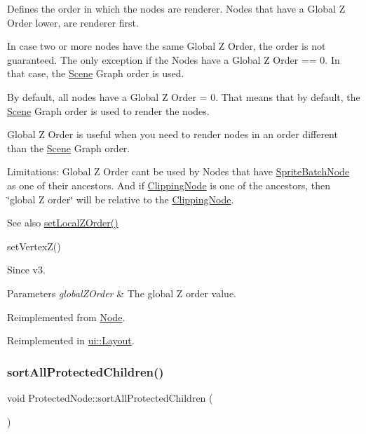 Defines the order in which the nodes are renderer. Nodes that have a Global Z Order lower, are renderer first.

In case two or more nodes have the same Global Z Order, the order is not guaranteed. The only exception if the Nodes have a Global Z Order == 0. In that case, the \hyperlink{classScene}{Scene} Graph order is used.

By default, all nodes have a Global Z Order = 0. That means that by default, the \hyperlink{classScene}{Scene} Graph order is used to render the nodes.

Global Z Order is useful when you need to render nodes in an order different than the \hyperlink{classScene}{Scene} Graph order.

Limitations\+: Global Z Order can\textquotesingle{}t be used by Nodes that have \hyperlink{classSpriteBatchNode}{Sprite\+Batch\+Node} as one of their ancestors. And if \hyperlink{classClippingNode}{Clipping\+Node} is one of the ancestors, then \char`\"{}global Z order\char`\"{} will be relative to the \hyperlink{classClippingNode}{Clipping\+Node}.

\begin{DoxySeeAlso}{See also}
{\ttfamily \hyperlink{classNode_aee4e616c2d55b722226aae1e68b4946f}{set\+Local\+Z\+Order()}} 

{\ttfamily set\+Vertex\+Z()}
\end{DoxySeeAlso}
\begin{DoxySince}{Since}
v3.
\end{DoxySince}

\begin{DoxyParams}{Parameters}
{\em global\+Z\+Order} & The global Z order value. \\
\hline
\end{DoxyParams}


Reimplemented from \hyperlink{classNode_a32a5b9cb9a408d04008c4935a4776566}{Node}.



Reimplemented in \hyperlink{classui_1_1Layout_a5ac5023a3f35c0ba03769ef6794c8537}{ui\+::\+Layout}.

\mbox{\label{classProtectedNode_a9be3508a853fd1c6e841b4ba50f4e1c8}} 
\subsubsection{\texorpdfstring{sort\+All\+Protected\+Children()}{sortAllProtectedChildren()}\hspace{0.1cm}{\footnotesize\ttfamily [1/2]}}
{\footnotesize\ttfamily void Protected\+Node\+::sort\+All\+Protected\+Children (\begin{DoxyParamCaption}{ }\end{DoxyParamCaption})\hspace{0.3cm}{\ttfamily [virtual]}}

